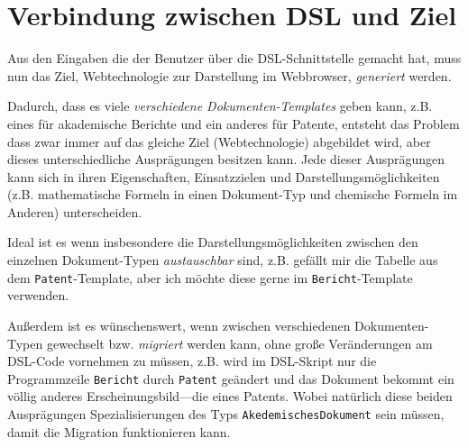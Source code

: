 \section{Verbindung zwischen DSL und Ziel}\label{sec-verbindung}

Aus den Eingaben die der Benutzer über die DSL-Schnittstelle gemacht hat,
muss nun das Ziel, Webtechnologie zur Darstellung im
Webbrowser, \emph{generiert} werden.

Dadurch, dass es viele \emph{verschiedene Dokumenten-Templates} geben kann,
z.B. eines für akademische Berichte und ein anderes für Patente, entsteht das
Problem dass zwar immer auf das gleiche Ziel (Webtechnologie) abgebildet
wird, aber dieses unterschiedliche Ausprägungen besitzen kann.
Jede dieser Ausprägungen kann sich in ihren Eigenschaften, Einsatzzielen
und Darstellungsmöglichkeiten (z.B. mathematische Formeln in einen
Dokument-Typ und chemische Formeln im Anderen) unterscheiden.

Ideal ist es wenn insbesondere die Darstellungsmöglichkeiten zwischen
den einzelnen Dokument-Typen \emph{austauschbar} sind, z.B. gefällt mir
die Tabelle aus dem \verb|Patent|-Template, aber ich möchte diese gerne im
\verb|Bericht|-Template verwenden.

Außerdem ist
es wünschenswert, wenn zwischen verschiedenen Dokumenten-Typen gewechselt
bzw. \emph{migriert} werden kann, ohne große Veränderungen am
DSL-Code vornehmen zu müssen, z.B. wird im
DSL-Skript nur die Programmzeile \verb|Bericht| durch \verb|Patent| geändert und
das Dokument bekommt ein völlig anderes Erscheinungsbild---die eines Patents.
Wobei natürlich diese beiden Ausprägungen Spezialisierungen des Typs
\verb|AkedemischesDokument| sein müssen, damit die Migration funktionieren kann.

